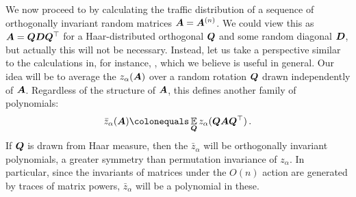 We now proceed to  by calculating the traffic distribution of a sequence of orthogonally invariant random matrices ${\bm A} = {\bm A}^{(n)}$.
We could view this as ${\bm A} = {\bm Q}{\bm D}{\bm Q}^{\top}$ for a Haar-distributed orthogonal ${\bm Q}$ and some random diagonal ${\bm D}$, but actually this will not be necessary.
Instead, let us take a perspective similar to the calculations in, for instance, \cite{KMW-2024-TensorCumulantsInvariantInference}, which we believe is useful in general.
Our idea will be to average the $z_{\alpha}({\bm A})$ over a random rotation ${\bm Q}$ drawn independently of ${\bm A}$.
Regardless of the structure of ${\bm A}$, this defines another family of polynomials:
\[ \bar{z}_{\alpha}(\bA) \colonequals \E_{\bQ} z_{\alpha}(\bQ\bA\bQ^{\top})\,. \]
If ${\bm Q}$ is drawn from Haar measure, then the $\bar{z}_{\alpha}$ will be orthogonally invariant polynomials, a greater symmetry than permutation invariance of $z_{\alpha}$.
In particular, since the invariants of matrices under the $O(n)$ action are generated by traces of matrix powers, $\bar{z}_{\alpha}$ will be a polynomial in these.

